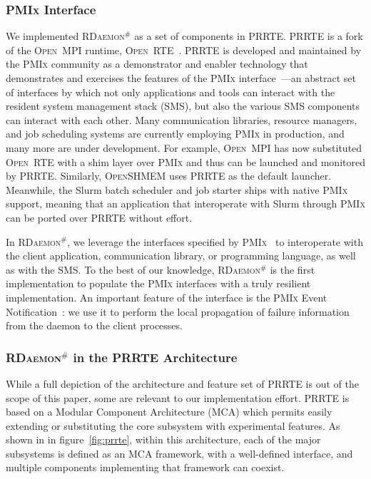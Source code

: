 \documentclass[sigconf]{acmart}
\newcommand{\prrte}[0]{\textsc{PRRTE}\xspace}
\newcommand{\pmix}[0]{\textsc{PMIx}\xspace}
\newcommand{\orte}[0]{\textsc{Open~RTE}\xspace}
\newcommand{\ompi}[0]{\textsc{Open~MPI}\xspace}
\newcommand{\oshmem}[0]{\textsc{OpenSHMEM}\xspace}
\newcommand{\ourwork}[0]{\textsc{RDaemon}\ensuremath{^\#}\xspace}
\begin{document}
\subsubsection{\pmix Interface}
We implemented \ourwork as a set of components in \prrte. \prrte is a fork of the \ompi runtime, \orte~\cite{Castain05}. \prrte is developed and maintained
by the \pmix community as a demonstrator and enabler technology that demonstrates
and exercises the features of the \pmix interface~\cite{CASTAIN18}---an abstract set of interfaces by which not only applications and tools can interact with the resident system management stack (SMS), but also the various SMS components can interact with each other.
Many communication libraries, resource managers, and job scheduling systems are currently employing \pmix in production, and many more are under development.
For example, \ompi has now substituted \orte with a shim layer over \pmix and thus can be launched and monitored by \prrte.
Similarly, \oshmem uses \prrte as the default launcher.
Meanwhile, the Slurm batch scheduler and job starter ships with native \pmix support, meaning that an application that interoperate with Slurm through \pmix can be ported  over \prrte without effort.

In \ourwork, we leverage the interfaces specified by \pmix~\cite{Ralph15} to interoperate 
with the client application, communication library, or programming language, as well as with the 
SMS. 
To the best of our knowledge, \ourwork is the first
implementation to populate the \pmix interfaces with a truly resilient implementation.
An important feature of the interface is the \pmix Event Notification~\cite{Ralph002}: 
we use it to perform the local propagation of failure information from the 
daemon to the client processes. 

\subsubsection{\ourwork in the \prrte Architecture}

While a full depiction of the architecture and feature set of \prrte is out of the scope of this paper, some are relevant to our implementation effort.
\prrte is based on a Modular Component Architecture (MCA) which permits easily extending or substituting the core subsystem with experimental features.
As shown in in figure~\ref{fig:prrte}, within this architecture, each of the major subsystems is defined as an MCA framework, with a well-defined interface, and multiple components implementing that framework can coexist.
\end{document}
